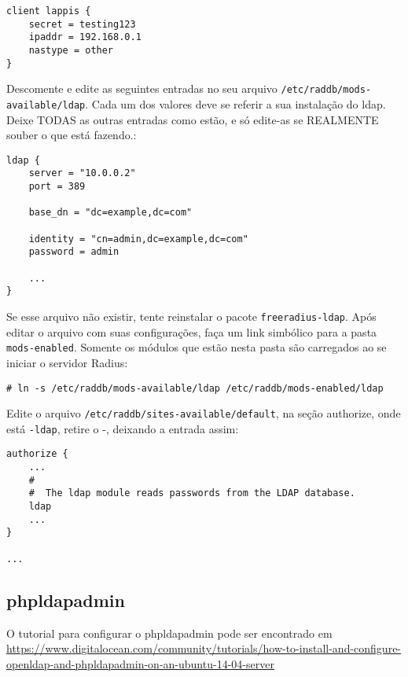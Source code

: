\begin{verbatim}
client lappis {
    secret = testing123
    ipaddr = 192.168.0.1
    nastype = other
}
\end{verbatim}

Descomente e edite as seguintes entradas no seu arquivo \verb|/etc/raddb/mods-available/ldap|.
Cada um dos valores deve se referir a sua instalação do ldap. Deixe TODAS as outras
entradas como estão, e só edite-as se REALMENTE souber o que está fazendo.:

\begin{verbatim}
ldap {
    server = "10.0.0.2"
    port = 389

    base_dn = "dc=example,dc=com"

    identity = "cn=admin,dc=example,dc=com"
    password = admin

    ...
}
\end{verbatim}

Se esse arquivo não existir, tente reinstalar o pacote \verb|freeradius-ldap|. Após
editar o arquivo com suas configurações, faça um link simbólico para a pasta
\verb|mods-enabled|. Somente os módulos que estão nesta pasta são carregados ao
se iniciar o servidor Radius:
\begin{verbatim}
# ln -s /etc/raddb/mods-available/ldap /etc/raddb/mods-enabled/ldap
\end{verbatim}


Edite o arquivo \verb|/etc/raddb/sites-available/default|, na seção authorize,
onde está \verb|-ldap|, retire o -, deixando a entrada assim:
\begin{verbatim}
authorize {
    ...
    #
    #  The ldap module reads passwords from the LDAP database.
    ldap
    ...
}

...

\end{verbatim}


\subsection{phpldapadmin}

O tutorial para configurar o phpldapadmin pode ser encontrado em \url{https://www.digitalocean.com/community/tutorials/how-to-install-and-configure-openldap-and-phpldapadmin-on-an-ubuntu-14-04-server}


